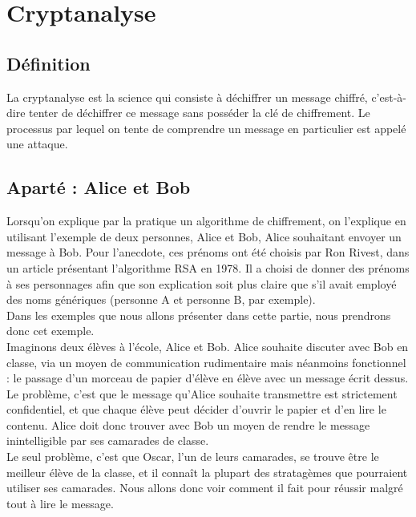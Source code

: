 \chapter{Cryptanalyse}
	\section{Définition}
		La cryptanalyse est la science qui consiste à déchiffrer un message chiffré, c’est-à-dire tenter de déchiffrer ce message sans posséder la clé de chiffrement. Le processus par lequel on tente de comprendre un message en particulier est appelé une attaque.
	\section{Aparté : Alice et Bob}
		Lorsqu'on explique par la pratique un algorithme de chiffrement, on l'explique en utilisant l'exemple de deux personnes, Alice et Bob, Alice souhaitant envoyer un message à Bob. Pour l'anecdote, ces prénoms ont été choisis par Ron Rivest, dans un article présentant l'algorithme RSA en 1978. Il a choisi de donner des prénoms à ses personnages afin que son explication soit plus claire que s'il avait employé des noms génériques (personne A et personne B, par exemple).\\
		Dans les exemples que nous allons présenter dans cette partie, nous prendrons donc cet exemple.\\
		Imaginons deux élèves à l'école, Alice et Bob. Alice souhaite discuter avec Bob en classe, via un moyen de communication rudimentaire mais néanmoins fonctionnel : le passage d'un morceau de papier d'élève en élève avec un message écrit dessus. Le problème, c'est que le message qu'Alice souhaite transmettre est strictement confidentiel, et que chaque élève peut décider d'ouvrir le papier et d'en lire le contenu. Alice doit donc trouver avec Bob un moyen de rendre le message inintelligible par ses camarades de classe.\\
		Le seul problème, c'est que Oscar, l'un de leurs camarades, se trouve être le meilleur élève de la classe, et il connaît la plupart des stratagèmes que pourraient utiliser ses camarades. Nous allons donc voir comment il fait pour réussir malgré tout à lire le message.
